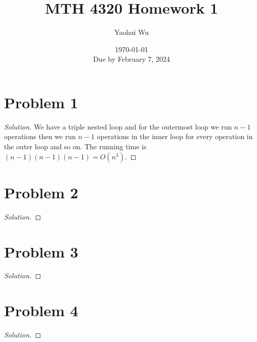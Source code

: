 \documentclass[12pt, letterpaper]{article}
\title{MTH 4320 Homework 1}
\author{Yaohui Wu}
\date{\today \\ Due by February 7, 2024}
\newenvironment{solution}{\begin{proof}[Solution]}{\end{proof}}
\begin{document}
\maketitle
\tableofcontents
\section{Problem 1}
\begin{solution}
    We have a triple nested loop and for the outermost loop we run \(n-1\) operations
    then we run \(n-1\) operations in the inner loop for every operation in the outer loop
    and so on. The running time is \((n-1)(n-1)(n-1)=O(n^3)\).
\end{solution}

\section{Problem 2}
\begin{solution}
    
\end{solution}

\section{Problem 3}
\begin{solution}
    
\end{solution}

\section{Problem 4}
\begin{solution}
    
\end{solution}
\end{document}
